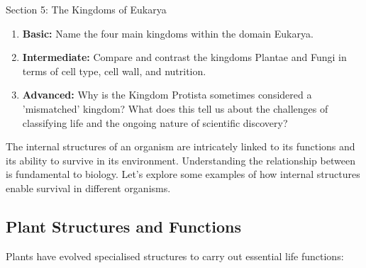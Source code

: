 \begin{tieredquestions}{Section 5: The Kingdoms of Eukarya}
\begin{enumerate}
    \item \textbf{Basic:} Name the four main kingdoms within the domain Eukarya.
    \item \textbf{Intermediate:} Compare and contrast the kingdoms Plantae and Fungi in terms of cell type, cell wall, and nutrition.
    \item \textbf{Advanced:}  Why is the Kingdom Protista sometimes considered a 'mismatched' kingdom? What does this tell us about the challenges of classifying life and the ongoing nature of scientific discovery?
\end{enumerate}
\end{tieredquestions}


\FloatBarrier

The internal structures of an organism are intricately linked to its functions and its ability to survive in its environment.  Understanding the relationship between  is fundamental to biology.  Let's explore some examples of how internal structures enable survival in different organisms.

\subsection{Plant Structures and Functions}

Plants have evolved specialised structures to carry out essential life functions:

